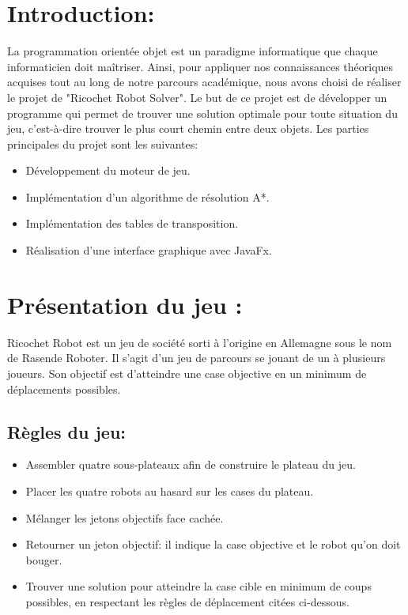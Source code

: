 \documentclass[12pt, a4paper, openany]{article}
\begin{document}
\section{Introduction: }
La programmation orientée objet est un paradigme informatique que chaque informaticien doit maîtriser.
Ainsi, pour appliquer nos connaissances théoriques acquises tout au long de notre parcours académique, nous avons choisi de réaliser le projet de "Ricochet Robot Solver". Le but de ce projet est de développer un programme qui permet de trouver une solution optimale pour toute situation du jeu, c'est-à-dire trouver le plus court chemin entre deux objets.
Les parties principales du projet sont les suivantes: 
\begin{itemize}
\item Développement du moteur de jeu.
\item Implémentation d'un algorithme de résolution A*.
\item Implémentation des tables de transposition.
\item Réalisation d'une interface graphique avec JavaFx.
\end{itemize}


\section{Présentation du jeu :}
Ricochet Robot est un jeu de société sorti à l'origine en Allemagne sous le nom de Rasende Roboter. Il s'agit d'un jeu de parcours se jouant de un à plusieurs joueurs. Son objectif est d'atteindre une case objective en un minimum de déplacements possibles.

\subsection{Règles du jeu:}
\begin{itemize}
\item Assembler quatre sous-plateaux afin de construire le plateau du jeu.
\item Placer les quatre robots au hasard sur les cases du plateau.
\item Mélanger les jetons objectifs face cachée.
\item Retourner un jeton objectif: il indique la case objective et le robot qu'on doit bouger.
\item Trouver une solution pour atteindre la case cible en minimum de coups possibles, en respectant les règles de déplacement citées ci-dessous.
\end{itemize}
\end{document}
